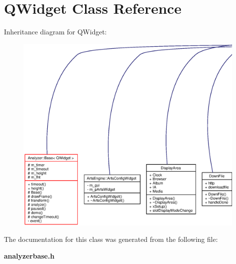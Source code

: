 \section{QWidget Class Reference}
\label{classQWidget}
Inheritance diagram for QWidget:\begin{figure}[H]
\begin{center}
\leavevmode
\includegraphics[width=420pt]{classQWidget__inherit__graph}
\end{center}
\end{figure}


The documentation for this class was generated from the following file:\begin{CompactItemize}
\item 
{\bf analyzerbase.h}\end{CompactItemize}
